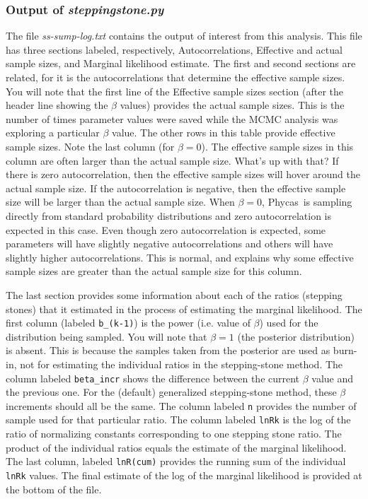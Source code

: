 \documentclass[10pt]{article}
\newcommand{\pathname}[1]{{\em #1}}				%
\newcommand{\code}[1]{{\tt #1}}					%
\newcommand{\phycas}{{\sc Phycas}\index{Phycas}}
\begin{document}
\subsubsection{Output of \pathname{steppingstone.py}}
The file \pathname{ss-sump-log.txt} contains the output of interest from this analysis. This file has three sections labeled, respectively, Autocorrelations, Effective and actual sample sizes, and Marginal likelihood estimate. The first and second sections are related, for it is the autocorrelations that determine the effective sample sizes. You will note that the first line of the Effective sample sizes section (after the header line showing the $\beta$ values) provides the actual sample sizes. This is the number of times parameter values were saved while the MCMC analysis was exploring a particular $\beta$ value. The other rows in this table provide effective sample sizes. Note the last column (for $\beta=0$). The effective sample sizes in this column are often larger than the actual sample size. What's up with that? If there is zero autocorrelation, then the effective sample sizes will hover around the actual sample size. If the autocorrelation is negative, then the effective sample size will be larger than the actual sample size. When $\beta=0$, \phycas\ is sampling directly from standard probability distributions and zero autocorrelation is expected in this case. Even though zero autocorrelation is expected, some parameters will have slightly negative autocorrelations and others will have slightly higher autocorrelations. This is normal, and explains why some effective sample sizes are greater than the actual sample size for this column. 

The last section provides some information about each of the ratios (stepping stones) that it estimated in the process of estimating the marginal likelihood. The first column (labeled \code{b\_(k-1)}) is the power (i.e. value of $\beta$) used for the distribution being sampled. You will note that $\beta=1$ (the posterior distribution) is absent. This is because the samples taken from the posterior are used as burn-in, not for estimating the individual ratios in the stepping-stone method. The column labeled \code{beta\_incr} shows the difference between the current $\beta$ value and the previous one. For the (default) generalized stepping-stone method, these $\beta$ increments should all be the same. The column labeled \code{n} provides the number of sample used for that particular ratio. The column labeled \code{lnRk} is the log of the ratio of normalizing constants corresponding to one stepping stone ratio. The product of the individual ratios equals the estimate of the marginal likelihood. The last column, labeled \code{lnR(cum)} provides the running sum of the individual \code{lnRk} values. The final estimate of the log of the marginal likelihood is provided at the bottom of the file.
\end{document}
